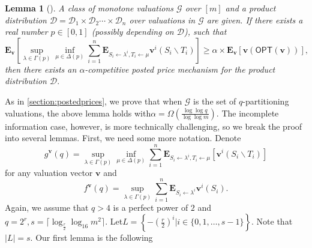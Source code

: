 \documentclass[11pt]{article}\usepackage{amsfonts}
\newtheorem{lemma}[theorem]{Lemma}
\numberwithin{theorem}{subsection}
\newcommand{\boldv}{\mathbf{v}}
\newcommand{\opt}{\mathsf{OPT}}
\newcommand{\expect}{\mathbf{E}}
\begin{document}
\begin{lemma}[{\cite[p.268]{DuttingKL20}}]
\label{lem:minimaxgamebayes}
A class of monotone valuations $\mathcal{G}$ over $[m]$ and a product distribution 
$\mathcal{D} = \mathcal{D}_1\times \mathcal{D}_2\cdots\times\mathcal{D}_n$ over valuations in $\mathcal{G}$ are given.
If there exists a real number $p \in [0,1]$ (possibly depending on $\mathcal{D}$), such that 
$$
\expect_{\boldv}\left[
\sup_{\lambda \in \Gamma(p)}
\inf_{\mu \in \Delta(p)}
\sum_{i = 1}^n 
\expect_{S_i\longleftarrow \lambda^i, T_i \longleftarrow \mu}\boldv^i(S_i\backslash T_i)
\right]\ge 
\alpha\times \expect_\boldv[\boldv(\opt(\boldv))],
$$
then there exists an $\alpha$-competitive posted price mechanism for the product distribution $\mathcal{D}.$
\end{lemma}

\noindent
As in \cref{section:postedprices}, we prove that when $\mathcal{G}$ is the set of $q$-partitioning valuations, the above lemma holds with\linebreak $\alpha = \Omega\left(\frac{\log \log q}{\log \log m}\right).$ The incomplete information case, however, is more technically challenging, so we break the proof into several lemmas. First, we need some more notation. Denote
$$
g^\boldv(q) = 
\sup_{\lambda \in \Gamma(p)}
\inf_{\mu \in \Delta(p)}
\sum_{i = 1}^n 
\expect_{S_i\longleftarrow \lambda^i, T_i \longleftarrow \mu}[\boldv^i(S_i\backslash T_i)]
$$
for any valuation vector $\boldv$ and
$$
f^\boldv(q) = 
\sup_{\lambda \in \Gamma(p)}
\sum_{i = 1}^n 
\expect_{S_i\longleftarrow \lambda^i}\boldv^i(S_i).
$$
Again, we assume that $q>4$ is a perfect power of $2$ and $q = 2^r,s = \lceil\log_{\frac{r}{2}}\log_{16} m^2\rceil.$
Let\linebreak $\displaystyle L = \left\{ {- \left(\frac{r}{2}\right)^i}|
i \in \{0,1,\ldots, s-1\}\right\}
.$ Note that $|L| = s .$ Our first lemma is the following 
\end{document}
